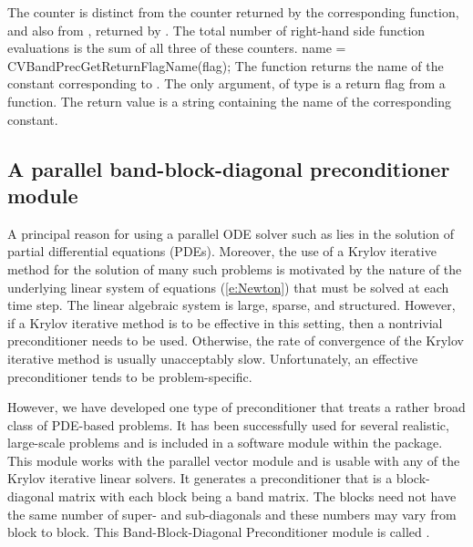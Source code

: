 {
The counter  is distinct from the counter 
returned by the corresponding  function, and
also from , returned by .
The total number of right-hand side function evaluations is the
sum of all three of these counters.
}
{
  name = CVBandPrecGetReturnFlagName(flag);
}
{
  The function  returns the
  name of the {\cvbandpre} constant corresponding to .
}
{
  The only argument, of type  is a return flag from a {\cvbandpre} function.
}
{
  The return value is a string containing the name of the corresponding constant.
}
{}

\subsection{A parallel band-block-diagonal preconditioner module}
\label{sss:cvbbdpre}

A principal reason for using a parallel ODE solver such as {\cvode} lies
in the solution of partial differential equations (PDEs).  Moreover,
the use of a Krylov iterative method for the solution of many such
problems is motivated by the nature of the underlying linear system of
equations (\ref{e:Newton}) that must be solved at each time step.  The
linear algebraic system is large, sparse, and structured. However, if
a Krylov iterative method is to be effective in this setting, then a
nontrivial preconditioner needs to be used.  Otherwise, the rate of
convergence of the Krylov iterative method is usually unacceptably
slow.  Unfortunately, an effective preconditioner tends to be
problem-specific.

However, we have developed one type of preconditioner that treats a
rather broad class of PDE-based problems.  It has been successfully
used for several realistic, large-scale problems \cite{HiTa:98} and is
included in a software module within the {\cvode} package. This module
works with the parallel vector module {\nvecp} and is usable with any of
the Krylov iterative linear solvers.  It generates a preconditioner
that is a block-diagonal matrix with each block being a band matrix.
The blocks need not have the same number of super- and sub-diagonals
and these numbers may vary from block to block. This Band-Block-Diagonal
Preconditioner module is called {\cvbbdpre}.

